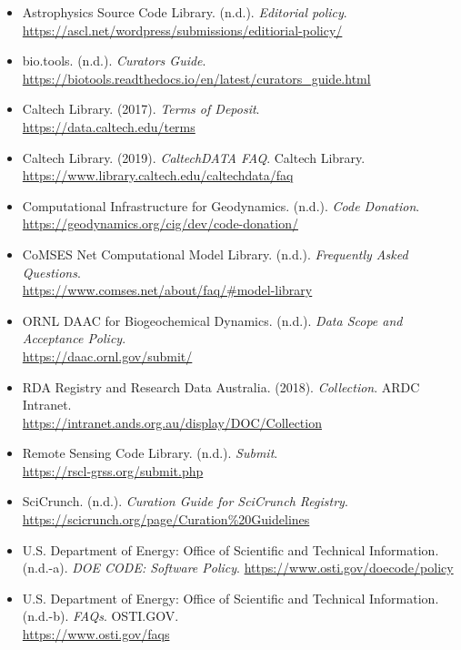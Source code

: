 \documentclass[11pt]{article}
\begin{document}
\begin{itemize}

\item Astrophysics Source Code Library. (n.d.). \emph{Editorial policy}.\\
\url{https://ascl.net/wordpress/submissions/editiorial-policy/}

\item bio.tools. (n.d.). \emph{Curators Guide}.\\
\url{https://biotools.readthedocs.io/en/latest/curators\_guide.html}

\item Caltech Library. (2017). \emph{Terms of Deposit}.\\
\url{https://data.caltech.edu/terms}

\item Caltech Library. (2019). \emph{CaltechDATA FAQ}. Caltech Library.\\
\url{https://www.library.caltech.edu/caltechdata/faq}

\item Computational Infrastructure for Geodynamics. (n.d.). \emph{Code Donation}.\\
\url{https://geodynamics.org/cig/dev/code-donation/}

\item CoMSES Net Computational Model Library. (n.d.). \emph{Frequently Asked Questions}.\\
\url{https://www.comses.net/about/faq/\#model-library}

\item ORNL DAAC for Biogeochemical Dynamics. (n.d.). 
\emph{Data Scope and Acceptance Policy}.\\
\url{https://daac.ornl.gov/submit/}

\item RDA Registry and Research Data Australia. (2018). \emph{Collection}.
ARDC Intranet.\\
\url{https://intranet.ands.org.au/display/DOC/Collection}

\item Remote Sensing Code Library. (n.d.). \emph{Submit}.\\
\url{https://rscl-grss.org/submit.php}

\item SciCrunch. (n.d.). \emph{Curation Guide for SciCrunch Registry}.\\
\url{https://scicrunch.org/page/Curation\%20Guidelines}

\item U.S. Department of Energy: Office of Scientific and Technical Information. (n.d.-a). \emph{DOE CODE: Software Policy}.
\url{https://www.osti.gov/doecode/policy}

\item U.S. Department of Energy: Office of Scientific and Technical
Information. (n.d.-b). \emph{FAQs}. OSTI.GOV.\\
\url{https://www.osti.gov/faqs}

\end{itemize}
\end{document}
